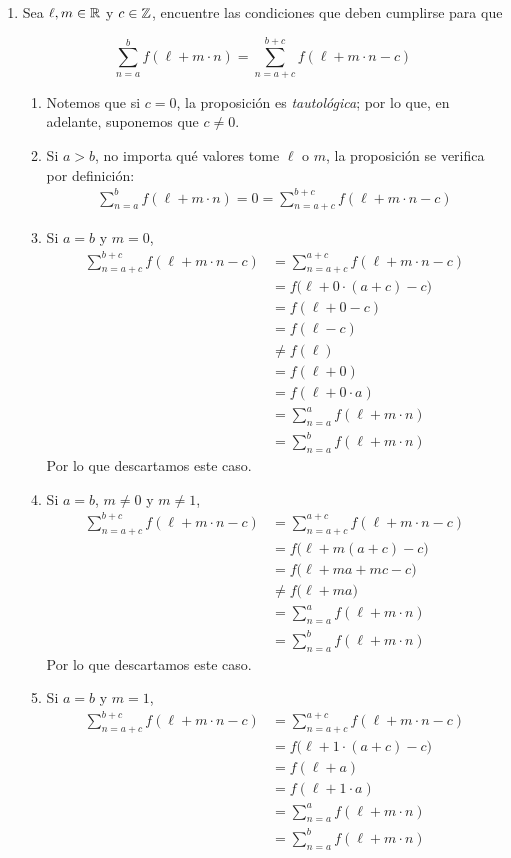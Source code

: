 \begin{enumerate}[label=\alph*)]
  \item Sea $\ell, m\in \mathbb{R}$ y $c\in \mathbb{Z}$, encuentre las condiciones que deben cumplirse para que
  
  \[\sum_{n=a}^b f(\ell+m\cdot n) = \sum_{n=a+c}^{b+c} f(\ell+m\cdot n-c)\]

  \begin{enumerate}[label=\Roman*)]
    \item Notemos que si $c=0$, la proposición es \textit{tautológica}; por lo que, en adelante, suponemos que $c\neq 0$.
    \item Si $a>b$, no importa qué valores tome $\ell$ o $m$, la proposición se verifica por definición:
    \begin{align*}
      \sum_{n=a}^b f(\ell+m\cdot n) = 0 = \sum_{n=a+c}^{b+c} f(\ell+m\cdot n-c)
    \end{align*}
    \item Si $a=b$ y $m=0$,
    \begin{align*}
      \sum_{n=a+c}^{b+c} f(\ell+m\cdot n-c) &= \sum_{n=a+c}^{a+c} f(\ell+m\cdot n-c)\\
      &= f\bigl(\ell+0\cdot (a+c)-c\bigr)\\
      &=f(\ell+0-c)\\
      &= f(\ell-c)\\
      &\neq f(\ell)\\
      &= f(\ell+0)\\
      &= f(\ell+0\cdot a)\\
      &= \sum_{n=a}^a f(\ell+m\cdot n)\\
      &= \sum_{n=a}^b f(\ell+m\cdot n)
    \end{align*}
    Por lo que descartamos este caso.

    \item Si $a=b$, $m\neq 0$ y $m\neq 1$,
    \begin{align*}
      \sum_{n=a+c}^{b+c} f(\ell+m\cdot n-c) &= \sum_{n=a+c}^{a+c} f(\ell+m\cdot n-c)\\
      &= f\bigl(\ell+m(a+c)-c\bigr)\\
      &= f\bigl(\ell+ma+mc-c\bigr)\\
      &\neq f\bigl(\ell+ma\bigr)\\
      &= \sum_{n=a}^a f(\ell+m\cdot n)\\
      &= \sum_{n=a}^b f(\ell+m\cdot n)
    \end{align*}
    Por lo que descartamos este caso.

    \item Si $a=b$ y $m=1$,
    \begin{align*}
      \sum_{n=a+c}^{b+c} f(\ell+m\cdot n-c) &= \sum_{n=a+c}^{a+c} f(\ell+m\cdot n-c)\\
      &= f\bigl(\ell+1\cdot (a+c)-c\bigr)\\
      &= f(\ell + a)\\
      &= f(\ell+1\cdot a)\\
      &= \sum_{n=a}^a f(\ell+m\cdot n)\\
      &= \sum_{n=a}^b f(\ell+m\cdot n)
    \end{align*}


\end{enumerate}
\end{enumerate}
